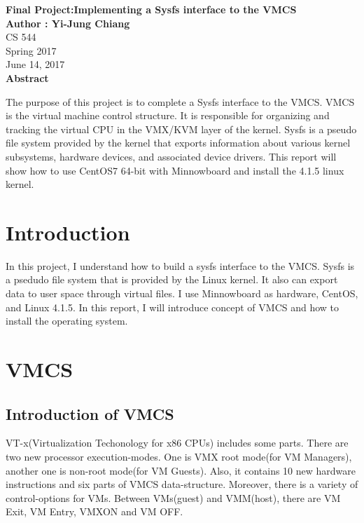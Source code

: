 \documentclass[10pt,draftclsnofoot,peerreview ,letterpaper,onecolumn,]{IEEEtran}
\begin{document}
\begin{titlepage}
    \begin{center}
        \vspace*{3.5cm}
        \Huge
        \textbf{Final Project:Implementing a Sysfs interface to the VMCS} \\
        \vspace{0.5cm}
        \Large
        \textbf{Author : Yi-Jung Chiang}\\
        \vspace{0.8cm}
        CS 544\\
        Spring 2017\\
        June 14, 2017\\
        \vspace{1cm}
        \textbf{Abstract}\\
        \end{center}
        \vspace{0.5cm}
       The purpose of this project is to complete a Sysfs interface to the VMCS. VMCS is the virtual machine control structure. It is responsible for organizing and tracking the virtual CPU in the VMX/KVM layer of the kernel. Sysfs is a pseudo file system provided by the kernel that exports information about various kernel subsystems, hardware devices, and associated device drivers. This report will show how to use CentOS7 64-bit with Minnowboard and install the 4.1.5 linux kernel.
        \vfill
\end{titlepage}


	\newpage
	\tableofcontents
	
	\newpage
	\section{Introduction}
    In this project, I understand how to build a sysfs interface to the VMCS. Sysfs is a psedudo file system that is provided by the Linux kernel. It also can export data to user space through virtual files. I use Minnowboard as hardware, CentOS, and Linux 4.1.5. In this report, I will introduce concept of VMCS and how to install the operating system.\\
	
	\section{VMCS}
	\subsection{Introduction of VMCS}
    VT-x(Virtualization Techonology for x86 CPUs) includes some parts. There are two new processor execution-modes. One is VMX root mode(for VM Managers), another one is non-root mode(for VM Guests). Also, it contains 10 new hardware instructions and six parts of VMCS data-structure. Moreover, there is a variety of control-options for VMs. Between VMs(guest) and VMM(host), there are VM Exit, VM Entry, VMXON and VM OFF. \\
    
\end{document}
